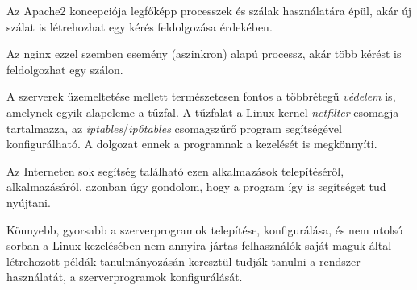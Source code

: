 Az Apache2 koncepciója legfőképp processzek és szálak használatára épül, akár új szálat is létrehozhat egy kérés feldolgozása érdekében.

Az nginx ezzel szemben esemény (aszinkron) alapú processz, akár több kérést is feldolgozhat egy szálon.

\medskip
A szerverek üzemeltetése mellett természetesen fontos a többrétegű \textit{védelem} is, amelynek egyik alapeleme a tűzfal. A tűzfalat a Linux kernel \textit{netfilter} csomagja tartalmazza, az \textit{iptables}/\textit{ip6tables} csomagszűrő program segítségével konfigurálható. A dolgozat ennek a programnak a kezelését is megkönnyíti.

\medskip
Az Interneten sok segítség található ezen alkalmazások telepítéséről, alkalmazásáról, azonban úgy gondolom, hogy a program így is segítséget tud nyújtani.

Könnyebb, gyorsabb a szerverprogramok telepítése, konfigurálása, és nem utolsó sorban a Linux kezelésében nem annyira jártas felhasználók saját maguk által létrehozott példák tanulmányozásán keresztül tudják tanulni a rendszer használatát, a szerverprogramok konfigurálását.